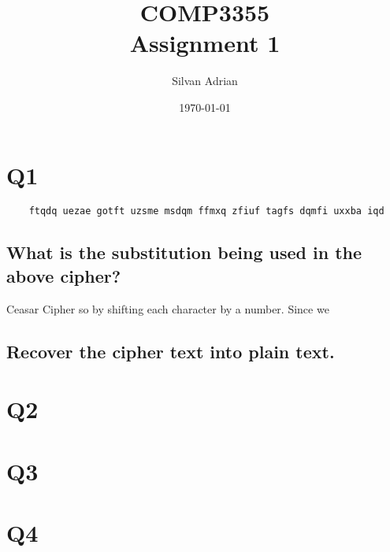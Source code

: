 \documentclass{article}
\title{COMP3355 \\Assignment 1}
\author{Silvan Adrian}
\date{\today}
\begin{document}
\maketitle

\section{Q1}


\begin{verbatim}
	ftqdq uezae gotft uzsme msdqm ffmxq zfiuf tagfs dqmfi uxxba iqd
\end{verbatim}

\subsection{What is the substitution being used in the above cipher?}

Ceasar Cipher so by shifting each character by a number.
Since we 

\subsection{Recover the cipher text into plain text.}


\section{Q2}

\section{Q3}

\section{Q4}
\end{document}
